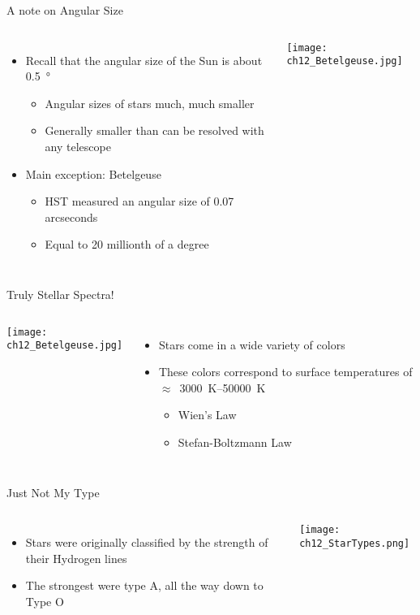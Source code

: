 \documentclass[pdf, aspectratio=169]{beamer}
\begin{document}
\begin{frame}{A note on Angular Size}
  \begin{columns}
	\begin{itemize}
	  \item Recall that the angular size of the Sun is about \SI{0.5}{\degree}
		\begin{itemize}
		  \item Angular sizes of stars much, much smaller
		  \item Generally smaller than can be resolved with any telescope
		\end{itemize}
	  \item Main exception: Betelgeuse
		\begin{itemize}
		  \item HST measured an angular size of 0.07 arcseconds
		  \item Equal to 20 millionth of a degree
		\end{itemize}
	\end{itemize}
	\begin{center}
	  \texttt{[image: ch12\_Betelgeuse.jpg]}
	\end{center}
  \end{columns}
\end{frame}

\begin{frame}{Truly Stellar Spectra!}
  \begin{columns}
	\begin{center}
	  \texttt{[image: ch12\_Betelgeuse.jpg]}
	\end{center}
	\begin{itemize}
	  \item Stars come in a wide variety of colors
	  \item These colors correspond to surface temperatures of $\approx$~\SIrange{3000}{50000}{\kelvin}
		\begin{itemize}
		  \item Wien's Law
		  \item Stefan-Boltzmann Law
		\end{itemize}
	\end{itemize}
  \end{columns}
\end{frame}

\begin{frame}{Just Not My Type}
  \begin{columns}
	\begin{itemize}
	  \item Stars were originally classified by the strength of their Hydrogen lines
	  \item The strongest were type A, all the way down to Type O
	\end{itemize}
	\begin{center}
	  \texttt{[image: ch12\_StarTypes.png]}
	\end{center}
  \end{columns}
\end{frame}
\end{document}
